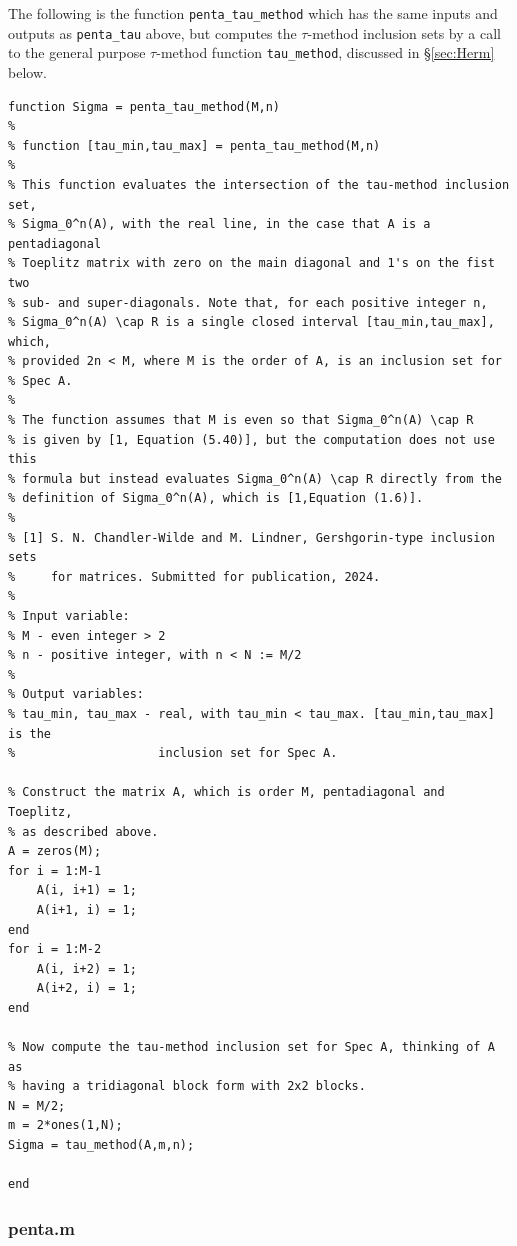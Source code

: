 \documentclass[preprint,1p,11pt]{elsarticle}
\numberwithin{equation}{section}   %
\numberwithin{figure}{section}  %
\begin{document}
The following is the function \verb+penta_tau_method+ which has the same inputs and outputs as \verb+penta_tau+ above, but computes the $\tau$-method inclusion sets by a call to the general purpose $\tau$-method function \verb+tau_method+, discussed in \S\ref{sec:Herm} below.

\begin{verbatim}
function Sigma = penta_tau_method(M,n)
%
% function [tau_min,tau_max] = penta_tau_method(M,n)
%
% This function evaluates the intersection of the tau-method inclusion set, 
% Sigma_0^n(A), with the real line, in the case that A is a pentadiagonal
% Toeplitz matrix with zero on the main diagonal and 1's on the fist two
% sub- and super-diagonals. Note that, for each positive integer n,
% Sigma_0^n(A) \cap R is a single closed interval [tau_min,tau_max], which,
% provided 2n < M, where M is the order of A, is an inclusion set for 
% Spec A. 
% 
% The function assumes that M is even so that Sigma_0^n(A) \cap R 
% is given by [1, Equation (5.40)], but the computation does not use this
% formula but instead evaluates Sigma_0^n(A) \cap R directly from the
% definition of Sigma_0^n(A), which is [1,Equation (1.6)].
%
% [1] S. N. Chandler-Wilde and M. Lindner, Gershgorin-type inclusion sets
%     for matrices. Submitted for publication, 2024.
%
% Input variable:
% M - even integer > 2
% n - positive integer, with n < N := M/2
%
% Output variables:
% tau_min, tau_max - real, with tau_min < tau_max. [tau_min,tau_max] is the
%                    inclusion set for Spec A.

% Construct the matrix A, which is order M, pentadiagonal and Toeplitz, 
% as described above.
A = zeros(M);
for i = 1:M-1
    A(i, i+1) = 1;
    A(i+1, i) = 1;
end
for i = 1:M-2
    A(i, i+2) = 1;
    A(i+2, i) = 1;
end 

% Now compute the tau-method inclusion set for Spec A, thinking of A as
% having a tridiagonal block form with 2x2 blocks.
N = M/2;
m = 2*ones(1,N);
Sigma = tau_method(A,m,n);

end
\end{verbatim}

\subsubsection{penta.m} \label{code:penta}
\end{document}
